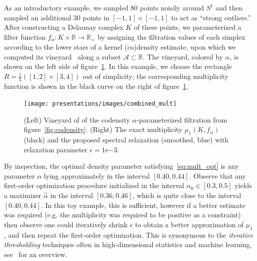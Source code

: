 \documentclass[10pt]{article}
\numberwithin{equation}{section}
\newcommand{\+}{%
	\raisebox{0.18ex}{\scaleobj{0.55}{+}}
}
\theoremstyle{definition}
\theoremstyle{definition}
\begin{document}
As an introductory example, we sampled $80$ points noisily around $S^1$ and then sampled an additional $30$ points in $[-1,1] \times [-1,1]$ to act as ``strong outliers.'' After constructing a Delaunay complex $K$ of these points, we parameterized a filter function $f_\alpha : K \times \mathbb{R} \to \mathbb{R}_+$ by assigning the filtration values of each simplex according to the lower stars of a kernel (co)density estimate, upon which we computed its vineyard~\cite{cohen2006vines} along a subset $\mathcal{A} \subset \mathbb{R}$. The vineyard, colored by $\alpha$, is shown on the left side of figure~\ref{fig:vineyard_codensity}. In this example, we choose the rectangle $R = \frac{1}{5}([1, 2] \times [3,4])$ out of simplicity; the corresponding multiplicity function is shown in the black curve on the right of figure~\ref{fig:vineyard_codensity}. 
\begin{figure}[h]
	\centering
	\texttt{[image: presentations/images/combined\_mult]}
	\caption{(Left) Vineyard of of the codensity $\alpha$-parameterized filtration from figure~\ref{fig:codensity}. (Right) The exact multiplicity $\mu_1(K, f_\alpha)$ (black) and the proposed spectral relaxation (smoothed, blue) with relaxation parameter $\epsilon = 1\mathrm{e}{-3}$.}\label{fig:vineyard_codensity}
\end{figure}
By inspection, the optimal density parameter satisfying~\eqref{eq:mult_opt} is any parameter $\alpha$ lying approximately in the interval $[0.40, 0.44]$. 
Observe that any first-order optimization procedure initialized in the interval $\alpha_0 \in [0.3, 0.5]$ yields a maximizer $\hat{\alpha}$ in the interval $[0.36, 0.46]$, which is quite close to the interval $[0.40, 0.44]$. In this toy example, this is sufficient, however if a better estimate was required (e.g. the multiplicity was required to be positive as a constraint) then observe one could iteratively shrink $\epsilon$ to obtain a better approximation of $\mu_1$, and then repeat the first-order optimization. 
This is synonymous to the \emph{iterative thresholding} techniques often in high-dimensional statistics and machine learning, see~\cite{} for an overview.




\end{document}
